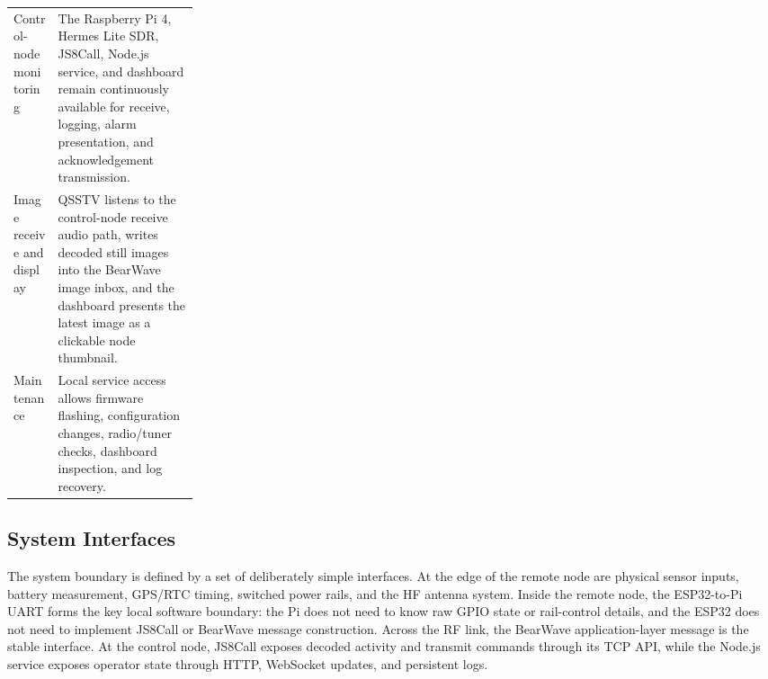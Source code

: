 \documentclass[acmsmall,screen]{acmart}
\begin{document}
\begin{table}[tbp]
\begin{tabularx}{\linewidth}{p{0.24\linewidth}X}
Control-node monitoring & The Raspberry Pi 4, Hermes Lite SDR, JS8Call, Node.js service, and dashboard remain continuously available for receive, logging, alarm presentation, and acknowledgement transmission. \\
Image receive and display & QSSTV listens to the control-node receive audio path, writes decoded still images into the BearWave image inbox, and the dashboard presents the latest image as a clickable node thumbnail. \\
Maintenance & Local service access allows firmware flashing, configuration changes, radio/tuner checks, dashboard inspection, and log recovery. \\
\bottomrule
\end{tabularx}
\end{table}

\subsection{System Interfaces}
The system boundary is defined by a set of deliberately simple interfaces. At the edge of the remote node are physical sensor inputs, battery measurement, GPS/RTC timing, switched power rails, and the HF antenna system. Inside the remote node, the ESP32-to-Pi UART forms the key local software boundary: the Pi does not need to know raw GPIO state or rail-control details, and the ESP32 does not need to implement JS8Call or BearWave message construction. Across the RF link, the BearWave application-layer message is the stable interface. At the control node, JS8Call exposes decoded activity and transmit commands through its TCP API, while the Node.js service exposes operator state through HTTP, WebSocket updates, and persistent logs.
\end{document}
